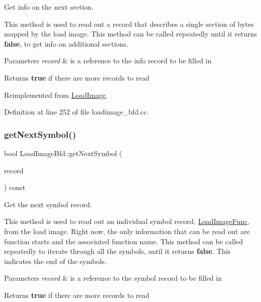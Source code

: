 Get info on the next section. 

This method is used to read out a record that describes a single section of bytes mapped by the load image. This method can be called repeatedly until it returns {\bfseries{false}}, to get info on additional sections. 
\begin{DoxyParams}{Parameters}
{\em record} & is a reference to the info record to be filled in \\
\hline
\end{DoxyParams}
\begin{DoxyReturn}{Returns}
{\bfseries{true}} if there are more records to read 
\end{DoxyReturn}


Reimplemented from \mbox{\hyperlink{class_load_image_ab4a927238becd33d8eb75ddc96cc9616}{Load\+Image}}.



Definition at line 252 of file loadimage\+\_\+bfd.\+cc.

\mbox{\label{class_load_image_bfd_a8db5bae4688dfea449ed8c5e9d584904}} 
\subsubsection{\texorpdfstring{getNextSymbol()}{getNextSymbol()}}
{\footnotesize\ttfamily bool Load\+Image\+Bfd\+::get\+Next\+Symbol (\begin{DoxyParamCaption}\item[{\mbox{\hyperlink{struct_load_image_func}{Load\+Image\+Func}} \&}]{record }\end{DoxyParamCaption}) const\hspace{0.3cm}{\ttfamily [virtual]}}



Get the next symbol record. 

This method is used to read out an individual symbol record, \mbox{\hyperlink{struct_load_image_func}{Load\+Image\+Func}}, from the load image. Right now, the only information that can be read out are function starts and the associated function name. This method can be called repeatedly to iterate through all the symbols, until it returns {\bfseries{false}}. This indicates the end of the symbols. 
\begin{DoxyParams}{Parameters}
{\em record} & is a reference to the symbol record to be filled in \\
\hline
\end{DoxyParams}
\begin{DoxyReturn}{Returns}
{\bfseries{true}} if there are more records to read 
\end{DoxyReturn}


